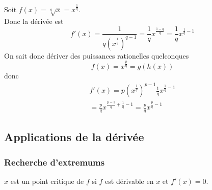 \documentclass[../main.tex]{subfiles}
\begin{document}
\begin{exemple}
	Soit $f( x) = \sqrt[q]{x} = x ^{\frac{1}{q}}$.\\
	Donc la dérivée est
	\[ 
		f'( x) = \frac{1}{q ( x^{\frac{1}{q}})^{q-1}}= \frac{1}{q} x^{ \frac{1-q}{q}} = \frac{1}{q} x^{\frac{1}{q}-1}
	\]
On sait donc dériver des puissances rationelles quelconques	
\[ 
	f( x) = x^{\frac{p}{q}} = g( h( x) ) 
\]
donc
\begin{align*}
	f'( x) = p( x^{\frac{1}{q}}) ^{p-1} \frac{1}{q} x^{\frac{1}{q}-1}\\
	= \frac{p}{q} x^{\frac{p-1}{q}+ \frac{1}{q}-1} = \frac{p}{q} x^{\frac{p}{q}-1}
\end{align*}

\end{exemple}
\subsection{Applications de la dérivée}
\subsubsection{Recherche d'extremums}
\begin{defn}
	$x$ est un point critique de $f$ si $f$ est dérivable en $x$ et $f'( x)=0 $.
\end{defn}
\end{document}
